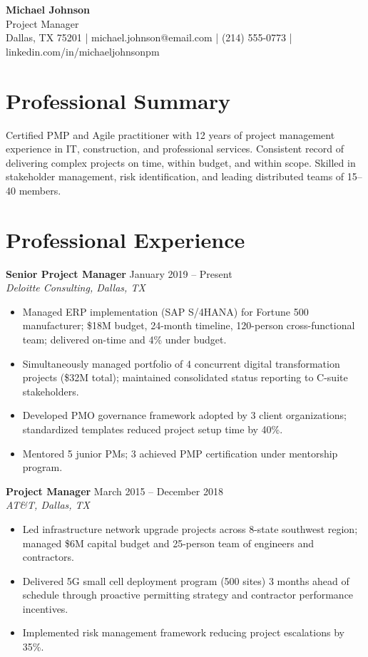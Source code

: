 \documentclass[11pt,letterpaper]{article}
\begin{document}
\begin{center}
  {\Large \textbf{Michael Johnson}}\\[4pt]
  Project Manager\\[3pt]
  Dallas, TX 75201 \quad | \quad
  michael.johnson@email.com \quad | \quad
  (214) 555-0773 \quad | \quad
  linkedin.com/in/michaeljohnsonpm
\end{center}

\section{Professional Summary}

Certified PMP and Agile practitioner with 12 years of project management experience in IT, construction, and professional services. Consistent record of delivering complex projects on time, within budget, and within scope. Skilled in stakeholder management, risk identification, and leading distributed teams of 15--40 members.

\section{Professional Experience}

\noindent\textbf{Senior Project Manager} \hfill January 2019 -- Present\\
\textit{Deloitte Consulting, Dallas, TX}
\begin{itemize}
  \item Managed ERP implementation (SAP S/4HANA) for Fortune 500 manufacturer; \$18M budget, 24-month timeline, 120-person cross-functional team; delivered on-time and 4\% under budget.
  \item Simultaneously managed portfolio of 4 concurrent digital transformation projects (\$32M total); maintained consolidated status reporting to C-suite stakeholders.
  \item Developed PMO governance framework adopted by 3 client organizations; standardized templates reduced project setup time by 40\%.
  \item Mentored 5 junior PMs; 3 achieved PMP certification under mentorship program.
\end{itemize}

\vspace{4pt}
\noindent\textbf{Project Manager} \hfill March 2015 -- December 2018\\
\textit{AT\&T, Dallas, TX}
\begin{itemize}
  \item Led infrastructure network upgrade projects across 8-state southwest region; managed \$6M capital budget and 25-person team of engineers and contractors.
  \item Delivered 5G small cell deployment program (500 sites) 3 months ahead of schedule through proactive permitting strategy and contractor performance incentives.
  \item Implemented risk management framework reducing project escalations by 35\%.
\end{itemize}
\end{document}
